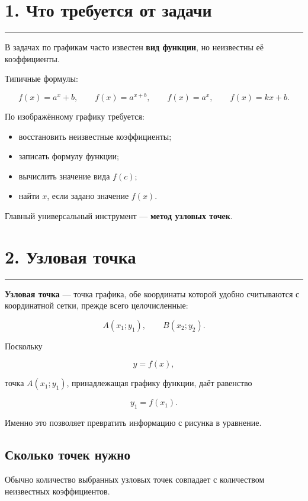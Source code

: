 \documentclass[a4paper,12pt]{article}
\newcommand{\sectionline}{%
    \vspace{0.2em}
    {\color{accent}\rule{\linewidth}{0.7pt}}
    \vspace{0.45em}
}
\newcommand{\key}[1]{\textcolor{darkaccent}{\textbf{#1}}}
\begin{document}
\section*{\textcolor{darkaccent}{1. Что требуется от задачи}}

\sectionline

В задачах по графикам часто известен \key{вид функции}, но неизвестны её коэффициенты.

Типичные формулы:

\[
f(x)=a^x+b,
\qquad
f(x)=a^{x+b},
\qquad
f(x)=a^x,
\qquad
f(x)=kx+b.
\]

По изображённому графику требуется:

\begin{itemize}[leftmargin=7mm,itemsep=2mm]
    \item восстановить неизвестные коэффициенты;
    \item записать формулу функции;
    \item вычислить значение вида \(f(c)\);
    \item найти \(x\), если задано значение \(f(x)\).
\end{itemize}

Главный универсальный инструмент --- \key{метод узловых точек}.

\section*{\textcolor{darkaccent}{2. Узловая точка}}

\sectionline

\key{Узловая точка} --- точка графика, обе координаты которой удобно считываются с координатной сетки, прежде всего целочисленные:

\[
A(x_1;y_1),\qquad B(x_2;y_2).
\]

Поскольку

\[
y=f(x),
\]

точка \(A(x_1;y_1)\), принадлежащая графику функции, даёт равенство

\[
y_1=f(x_1).
\]

Именно это позволяет превратить информацию с рисунка в уравнение.

\subsection*{\textcolor{accent}{Сколько точек нужно}}

Обычно количество выбранных узловых точек совпадает с количеством неизвестных коэффициентов.
\end{document}
